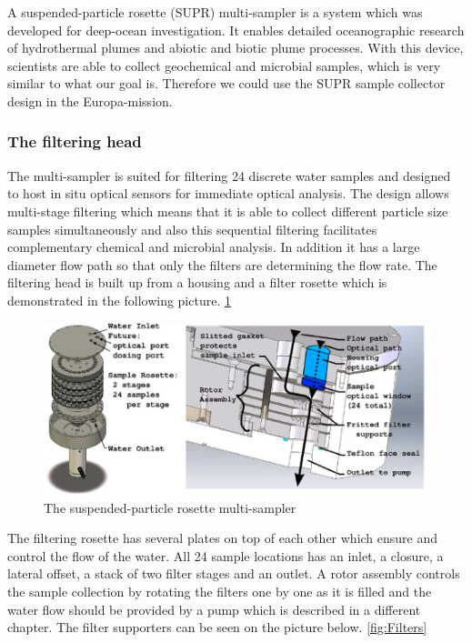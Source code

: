 
A suspended-particle rosette (SUPR) multi-sampler is a system which was developed for deep-ocean investigation. It enables detailed oceanographic research of hydrothermal plumes and abiotic and biotic plume processes. With this device, scientists are able to collect geochemical and microbial samples, which is very similar to what our goal is. Therefore we could use the SUPR sample collector design in the Europa-mission.
\cite{Breier20091579}

\subsubsection{The filtering head}
The multi-sampler is suited for filtering 24 discrete water samples and designed to host in situ optical sensors for immediate optical analysis.
The design allows multi-stage filtering which means that it is able to collect different particle size samples simultaneously and also this sequential filtering facilitates complementary chemical and microbial analysis. In addition it has a large diameter flow path so that only the filters are determining the flow rate.
The filtering head is built up from a housing and a filter rosette which is demonstrated in the following picture. 
\ref{fig:SUPR_head}

\begin{figure}[htb]
  \centering
  \includegraphics[scale=0.65]{figures/BFfig/SUPR_head}
  \caption{The suspended-particle rosette multi-sampler  }
  \label{fig:SUPR_head}
\end{figure}

The filtering rosette has several plates on top of each other which ensure and control the flow of the water. All 24 sample locations has an inlet, a closure, a lateral offset, a stack of two filter stages and an outlet. A rotor assembly controls the sample collection by rotating the filters one by one as it is filled and the water flow should be provided by a pump which is described in a different chapter.
The filter supporters can be seen on the picture below. 
\ref{fig:Filters}


